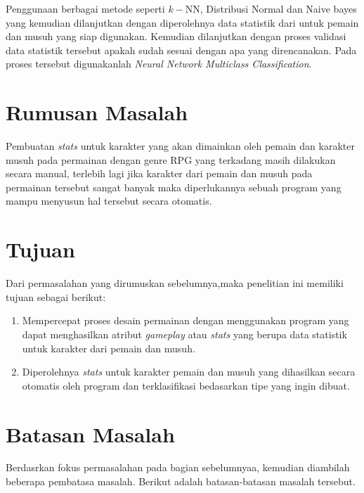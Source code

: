 Penggunaan berbagai metode seperti $k-$NN, Distribusi Normal dan Naive bayes yang kemudian dilanjutkan dengan diperolehnya data statistik dari untuk pemain dan musuh yang siap digunakan. Kemudian dilanjutkan dengan proses validasi data statistik tersebut apakah sudah sesuai dengan apa yang direncanakan. Pada proses tersebut digunakanlah \textit{Neural Network Multiclass Classification}.
\vspace{1ex}

\section{Rumusan Masalah}
\vspace{1ex}

Pembuatan \textit{stats} untuk karakter yang akan dimainkan oleh pemain dan karakter musuh pada permainan dengan genre RPG yang terkadang masih dilakukan secara manual, terlebih lagi jika karakter dari pemain dan musuh pada permainan tersebut sangat banyak maka diperlukannya sebuah program yang mampu menyusun hal tersebut secara otomatis.
\vspace{1ex}

\section{Tujuan}
\vspace{1ex}

Dari permasalahan yang dirumuskan sebelumnya,maka penelitian ini memiliki tujuan sebagai berikut: 

\begin{enumerate}
	\item Mempercepat proses desain permainan dengan menggunakan program yang dapat menghasilkan atribut \textit{gameplay} atau \textit{stats} yang berupa data statistik untuk karakter dari pemain dan musuh.

	\item Diperolehnya \textit{stats} untuk karakter pemain dan musuh yang dihasilkan secara otomatis oleh program dan terklasifikasi bedasarkan tipe yang ingin dibuat.
\end{enumerate}

\section{Batasan Masalah}
\vspace{1ex}

Berdasrkan fokus permasalahan pada bagian sebelumnyaa, kemudian diambilah beberapa pembatasa masalah. Berikut adalah batasan-batasan masalah tersebut.

